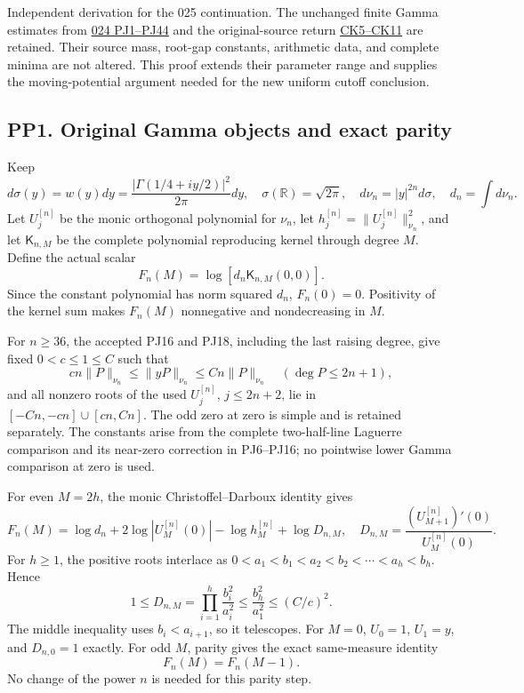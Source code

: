 \documentclass[10pt]{article}
\begin{document}
Independent derivation for the 025 continuation. The unchanged finite Gamma estimates from \href{https://github.com/KokunoYumeto/zeta-function-research-reader/blob/1447462732b40b1474bd9a819cf79257f5326ada/workbenches/splitzero-tandem/continuations/20260922-kernel-frequency/POWER_JET_PROOF.md}{024 PJ1--PJ44} and the original-source return \href{https://github.com/KokunoYumeto/zeta-function-research-reader/blob/1447462732b40b1474bd9a819cf79257f5326ada/workbenches/splitzero-tandem/continuations/20260922-kernel-frequency/COMBINED_KERNEL_AND_RECEIVERS.md}{CK5--CK11} are retained. Their source mass, root-gap constants, arithmetic data, and complete minima are not altered. This proof extends their parameter range and supplies the moving-potential argument needed for the new uniform cutoff conclusion.

\subsection{PP1. Original Gamma objects and exact parity}\label{pp1.-original-gamma-objects-and-exact-parity}

Keep \[
d\sigma(y)=w(y)dy=\frac{|\Gamma(1/4+iy/2)|^2}{2\pi}dy,
\quad \sigma(\mathbb R)=\sqrt{2\pi},
\quad d\nu_n=|y|^{2n}d\sigma,
\quad d_n=\int d\nu_n.
\tag{PP1}
\] Let \(U_j^{[n]}\) be the monic orthogonal polynomial for \(\nu_n\), let \(h_j^{[n]}=\|U_j^{[n]}\|_{\nu_n}^2\), and let \(\mathsf K_{n,M}\) be the complete polynomial reproducing kernel through degree \(M\). Define the actual scalar \[
F_n(M)=\log[d_n\mathsf K_{n,M}(0,0)].
\tag{PP2}
\] Since the constant polynomial has norm squared \(d_n\), \(F_n(0)=0\). Positivity of the kernel sum makes \(F_n(M)\) nonnegative and nondecreasing in \(M\).

For \(n\ge36\), the accepted PJ16 and PJ18, including the last raising degree, give fixed \(0<c\le1\le C\) such that \[
cn\|P\|_{\nu_n}\le\|yP\|_{\nu_n}\le Cn\|P\|_{\nu_n}
\quad(\deg P\le2n+1),
\tag{PP3}
\] and all nonzero roots of the used \(U_j^{[n]}\), \(j\le2n+2\), lie in \([-Cn,-cn]\cup[cn,Cn]\). The odd zero at zero is simple and is retained separately. The constants arise from the complete two-half-line Laguerre comparison and its near-zero correction in PJ6--PJ16; no pointwise lower Gamma comparison at zero is used.

For even \(M=2h\), the monic Christoffel--Darboux identity gives \[
F_n(M)=\log d_n+2\log|U_M^{[n]}(0)|-\log h_M^{[n]}+\log D_{n,M},
\quad D_{n,M}=\frac{(U_{M+1}^{[n]})'(0)}{U_M^{[n]}(0)}.
\tag{PP4}
\] For \(h\ge1\), the positive roots interlace as \(0<a_1<b_1<a_2<b_2<\cdots<a_h<b_h\). Hence \[
1\le D_{n,M}=\prod_{i=1}^h\frac{b_i^2}{a_i^2}
\le\frac{b_h^2}{a_1^2}\le(C/c)^2.
\tag{PP5}
\] The middle inequality uses \(b_i<a_{i+1}\), so it telescopes. For \(M=0\), \(U_0=1\), \(U_1=y\), and \(D_{n,0}=1\) exactly. For odd \(M\), parity gives the exact same-measure identity \[
F_n(M)=F_n(M-1).
\tag{PP6}
\] No change of the power \(n\) is needed for this parity step.
\end{document}
